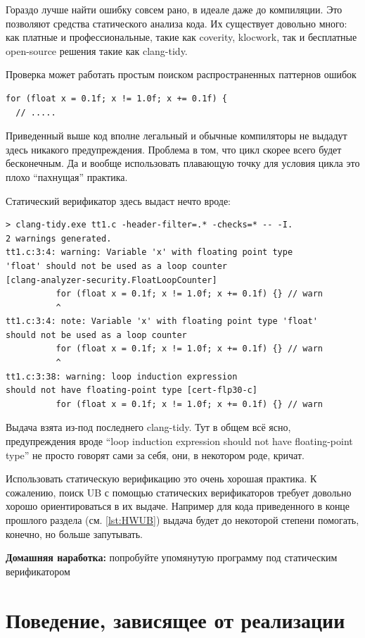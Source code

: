 \documentclass[a4paper,12pt,oneside]{book}
\begin{document}
Гораздо лучше найти ошибку совсем рано, в идеале даже до компиляции. Это позволяют средства статического анализа кода. Их существует довольно много: как платные и профессиональные, такие как coverity, klocwork, так и бесплатные open-source решения такие как clang-tidy.

Проверка может работать простым поиском распространенных паттернов ошибок

\begin{lstlisting}
for (float x = 0.1f; x != 1.0f; x += 0.1f) {
  // .....
\end{lstlisting}

Приведенный выше код вполне легальный и обычные компиляторы не выдадут здесь никакого предупреждения. Проблема в том, что цикл скорее всего будет бесконечным. Да и вообще использовать плавающую точку для условия цикла это плохо ``пахнущая'' практика.

Статический верификатор здесь выдаст нечто вроде:

\begin{verbatim}
> clang-tidy.exe tt1.c -header-filter=.* -checks=* -- -I.
2 warnings generated.
tt1.c:3:4: warning: Variable 'x' with floating point type 
'float' should not be used as a loop counter 
[clang-analyzer-security.FloatLoopCounter]
          for (float x = 0.1f; x != 1.0f; x += 0.1f) {} // warn
          ^
tt1.c:3:4: note: Variable 'x' with floating point type 'float' 
should not be used as a loop counter
          for (float x = 0.1f; x != 1.0f; x += 0.1f) {} // warn
          ^
tt1.c:3:38: warning: loop induction expression 
should not have floating-point type [cert-flp30-c]
          for (float x = 0.1f; x != 1.0f; x += 0.1f) {} // warn
\end{verbatim}

Выдача взята из-под последнего clang-tidy. Тут в общем всё ясно, предупреждения вроде ``loop induction expression should not have floating-point type'' не просто говорят сами за себя, они, в некотором роде, кричат.

Использовать статическую верификацию это очень хорошая практика. К сожалению, поиск UB с помощью статических верификаторов требует довольно хорошо ориентироваться в их выдаче. Например для кода приведенного в конце прошлого раздела (см. \ref{lst:HWUB}) выдача будет до некоторой степени помогать, конечно, но больше запутывать.

\textbf{Домашняя наработка:} попробуйте упомянутую программу под статическим верификатором

\section{Поведение, зависящее от реализации}\label{ImplementationDefined}
\end{document}
